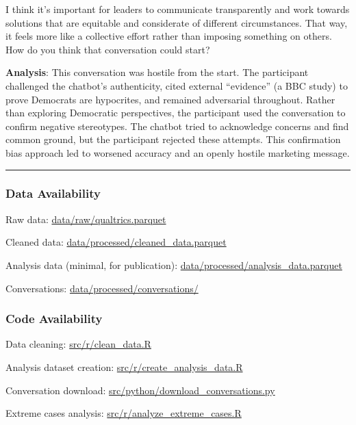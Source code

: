 \documentclass[
  11pt,
  oneside]{article}
\begin{document}
I think it's important for leaders to communicate transparently and work
towards solutions that are equitable and considerate of different
circumstances. That way, it feels more like a collective effort rather
than imposing something on others. How do you think that conversation
could start?

\textbf{Analysis}: This conversation was hostile from the start. The
participant challenged the chatbot's authenticity, cited external
``evidence'' (a BBC study) to prove Democrats are hypocrites, and
remained adversarial throughout. Rather than exploring Democratic
perspectives, the participant used the conversation to confirm negative
stereotypes. The chatbot tried to acknowledge concerns and find common
ground, but the participant rejected these attempts. This confirmation
bias approach led to worsened accuracy and an openly hostile marketing
message.

\begin{center}\rule{0.5\linewidth}{0.5pt}\end{center}

\subsubsection{Data Availability}\label{data-availability}

Raw data:
\href{../data/raw/qualtrics.parquet}{data/raw/qualtrics.parquet}

Cleaned data:
\href{../data/processed/cleaned_data.parquet}{data/processed/cleaned\_data.parquet}

Analysis data (minimal, for publication):
\href{../data/processed/analysis_data.parquet}{data/processed/analysis\_data.parquet}

Conversations:
\href{../data/processed/conversations/}{data/processed/conversations/}

\subsubsection{Code Availability}\label{code-availability}

Data cleaning: \href{../src/r/clean_data.R}{src/r/clean\_data.R}

Analysis dataset creation:
\href{../src/r/create_analysis_data.R}{src/r/create\_analysis\_data.R}

Conversation download:
\href{../src/python/download_conversations.py}{src/python/download\_conversations.py}

Extreme cases analysis:
\href{../src/r/analyze_extreme_cases.R}{src/r/analyze\_extreme\_cases.R}
\end{document}
